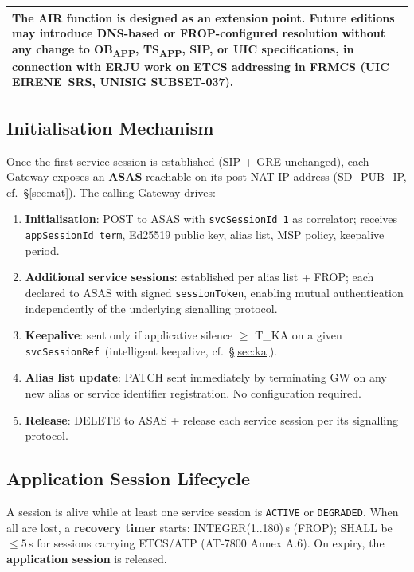 \documentclass[11pt,a4paper]{article}
\newenvironment{notebox}{%
  \begin{center}\begin{tabular}{|p{0.93\textwidth}|}\hline\rowcolor{noteblue}
}{\\\hline\end{tabular}\end{center}}
\newcommand{\OBAPP}{OB\textsubscript{APP}}
\newcommand{\TSAPP}{TS\textsubscript{APP}}
\newcommand{\svcref}{\texttt{svcSessionRef}}
\newcommand{\appterm}{\texttt{appSessionId\_term}}
\begin{document}
\begin{notebox}
  The AIR function is designed as an \textbf{extension point}. Future editions may
  introduce DNS-based or FROP-configured resolution without any change to \OBAPP,
  \TSAPP, SIP, or UIC specifications, in connection with ERJU work on ETCS addressing
  in FRMCS (UIC EIRENE~SRS, UNISIG SUBSET-037).
\end{notebox}

\subsection{Initialisation Mechanism}

Once the first service session is established (SIP + GRE unchanged), each Gateway
exposes an \textbf{ASAS} reachable on its post-NAT IP address (SD\_PUB\_IP,
cf.\ §\ref{sec:nat}). The calling Gateway drives:

\begin{enumerate}[leftmargin=2em]
  \item \textbf{Initialisation}: POST to ASAS with \texttt{svcSessionId\_1} as
    correlator; receives \appterm, Ed25519 public key, alias list, MSP policy,
    keepalive period.
  \item \textbf{Additional service sessions}: established per alias list + FROP; each
    declared to ASAS with signed \texttt{sessionToken}, enabling mutual authentication
    independently of the underlying signalling protocol.
  \item \textbf{Keepalive}: sent only if applicative silence $\geq$ T\_KA on a given
    \svcref\ (intelligent keepalive, cf.\ §\ref{sec:ka}).
  \item \textbf{Alias list update}: PATCH sent immediately by terminating GW on any
    new alias or service identifier registration. No configuration required.
  \item \textbf{Release}: DELETE to ASAS + release each service session per its
    signalling protocol.
\end{enumerate}

\subsection{Application Session Lifecycle}

A session is alive while at least one service session is \texttt{ACTIVE} or
\texttt{DEGRADED}. When all are lost, a \textbf{recovery timer} starts:
INTEGER(1..180)\,s (FROP); SHALL be $\leq 5$\,s for sessions carrying ETCS/ATP
(AT-7800 Annex A.6). On expiry, the \textbf{application session} is released.
\end{document}

